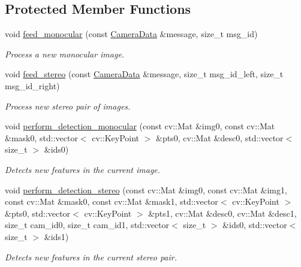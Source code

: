 \subsection*{Protected Member Functions}
\begin{DoxyCompactItemize}
\item 
void \hyperlink{classov__core_1_1TrackDescriptor_ada58eab951f766db88f48879d30b72b7}{feed\+\_\+monocular} (const \hyperlink{structov__core_1_1CameraData}{Camera\+Data} \&message, size\+\_\+t msg\+\_\+id)
\begin{DoxyCompactList}\small\item\em Process a new monocular image. \end{DoxyCompactList}\item 
void \hyperlink{classov__core_1_1TrackDescriptor_a4f182f8ee96c73f9105a8a1fa3f5eee1}{feed\+\_\+stereo} (const \hyperlink{structov__core_1_1CameraData}{Camera\+Data} \&message, size\+\_\+t msg\+\_\+id\+\_\+left, size\+\_\+t msg\+\_\+id\+\_\+right)
\begin{DoxyCompactList}\small\item\em Process new stereo pair of images. \end{DoxyCompactList}\item 
void \hyperlink{classov__core_1_1TrackDescriptor_a5f1db51d0c57dab6ed1da4dc17add0a1}{perform\+\_\+detection\+\_\+monocular} (const cv\+::\+Mat \&img0, const cv\+::\+Mat \&mask0, std\+::vector$<$ cv\+::\+Key\+Point $>$ \&pts0, cv\+::\+Mat \&desc0, std\+::vector$<$ size\+\_\+t $>$ \&ids0)
\begin{DoxyCompactList}\small\item\em Detects new features in the current image. \end{DoxyCompactList}\item 
void \hyperlink{classov__core_1_1TrackDescriptor_a0f3bfb96dcfc50ce8ebc1e40171d50c0}{perform\+\_\+detection\+\_\+stereo} (const cv\+::\+Mat \&img0, const cv\+::\+Mat \&img1, const cv\+::\+Mat \&mask0, const cv\+::\+Mat \&mask1, std\+::vector$<$ cv\+::\+Key\+Point $>$ \&pts0, std\+::vector$<$ cv\+::\+Key\+Point $>$ \&pts1, cv\+::\+Mat \&desc0, cv\+::\+Mat \&desc1, size\+\_\+t cam\+\_\+id0, size\+\_\+t cam\+\_\+id1, std\+::vector$<$ size\+\_\+t $>$ \&ids0, std\+::vector$<$ size\+\_\+t $>$ \&ids1)
\begin{DoxyCompactList}\small\item\em Detects new features in the current stereo pair. \end{DoxyCompactList}\item 

\end{DoxyCompactItemize}
